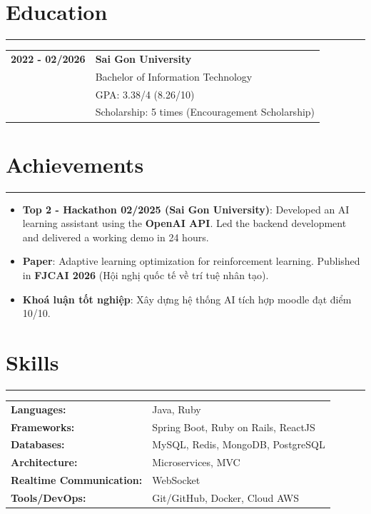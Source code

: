\documentclass[a4paper,10pt]{article}
\renewcommand{\arraystretch}{1.2}
\begin{document}
\section{Education}
\vspace{-10pt}
\noindent\rule{\linewidth}{0.5pt}
\begin{tabularx}{\linewidth}{l X}
    \textbf{2022 - 02/2026} & \textbf{Sai Gon University} \\ 
    & Bachelor of Information Technology \\ 
    & GPA: 3.38/4 (8.26/10) \\ 
    & Scholarship: 5 times (Encouragement Scholarship)
\end{tabularx}

\section{Achievements}
\vspace{-8pt}
\noindent\rule{\linewidth}{0.5pt}
\begin{itemize}
    \item \textbf{Top 2 - Hackathon 02/2025 (Sai Gon University)}: Developed an AI learning assistant using the \textbf{OpenAI API}. Led the backend development and delivered a working demo in 24 hours.
    \item \textbf{Paper}: Adaptive learning optimization for reinforcement learning. Published in \textbf{FJCAI 2026} (Hội nghị quốc tế về trí tuệ nhân tạo).
    \item \textbf{Khoá luận tốt nghiệp}: Xây dựng hệ thống AI tích hợp moodle đạt điểm 10/10.
\end{itemize}

\section{Skills}
\vspace{-10pt}
\noindent\rule{\linewidth}{0.5pt}
\renewcommand{\arraystretch}{1.1}
\begin{tabularx}{\linewidth}{l X}
    \textbf{Languages:} & Java, Ruby \\
    \textbf{Frameworks:} & Spring Boot, Ruby on Rails, ReactJS \\
    \textbf{Databases:} & MySQL, Redis, MongoDB, PostgreSQL \\
    \textbf{Architecture:} & Microservices, MVC \\
    \textbf{Realtime Communication:} & WebSocket \\
    \textbf{Tools/DevOps:} & Git/GitHub, Docker, Cloud AWS\\
\end{tabularx}
\end{document}
